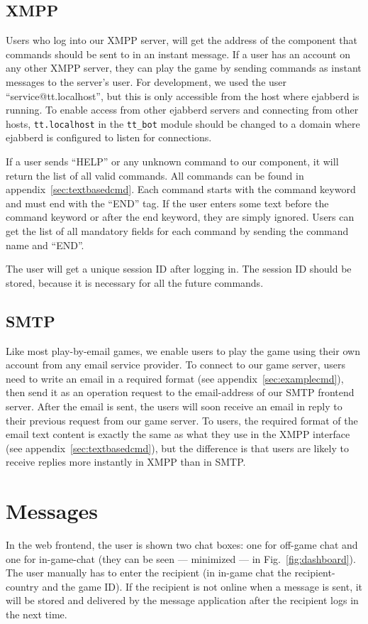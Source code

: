 \documentclass[11pt,a4paper]{report}
\begin{document}
\subsection{XMPP}
Users who log into our XMPP server, will get the address of the component that
commands should be sent to in an instant message. If a user has an account
on any other XMPP server, they can play the game by sending commands as instant
messages to the server's user. For development, we used the user
``service@tt.localhost'', but this is only accessible from the host where ejabberd
is running. To enable access from other ejabberd servers and connecting from
other hosts, {\tt tt.localhost} in the {\tt tt\_bot} module should be changed to
a domain where ejabberd is configured to listen for connections.

If a user sends  ``HELP'' or any unknown command to our component, it will
return the list of all valid commands. All commands can be found in
appendix~\ref{sec:textbasedcmd}.
Each command starts with the command keyword and must end with the ``END'' tag.
If the user enters some text before the command keyword or after the end
keyword, they are simply ignored. Users can get the list of all mandatory fields
for each command by sending the command name and ``END''.

The user will get a unique session ID after logging in. The session ID should be
stored, because it is necessary for all the future commands.

\subsection{SMTP}
Like most play-by-email games, we enable users to play the game using their own
account from any email service provider.
To connect to our game server, users need to write an email in a required
format (see appendix~\ref{sec:examplecmd}),
then send it as an operation request to the email-address of our SMTP frontend
server. After the email is sent, the users will soon receive an email in reply
to their previous request from our game server. To users, the required format
of the email text content is exactly the same as what they use in the XMPP
interface (see appendix~\ref{sec:textbasedcmd}), but the difference is that
users are likely to receive replies more instantly in XMPP than in SMTP.

\section{Messages}
In the web frontend, the user is shown two chat boxes: one for off-game chat
and one for in-game-chat (they can be seen --- minimized --- in
Fig.~\ref{fig:dashboard}). The user manually has to enter the recipient (in
in-game chat the recipient-country and the game ID). If the recipient is not
online when a message is sent, it will be stored and delivered by the message
application after the recipient logs in the next time.
\end{document}
